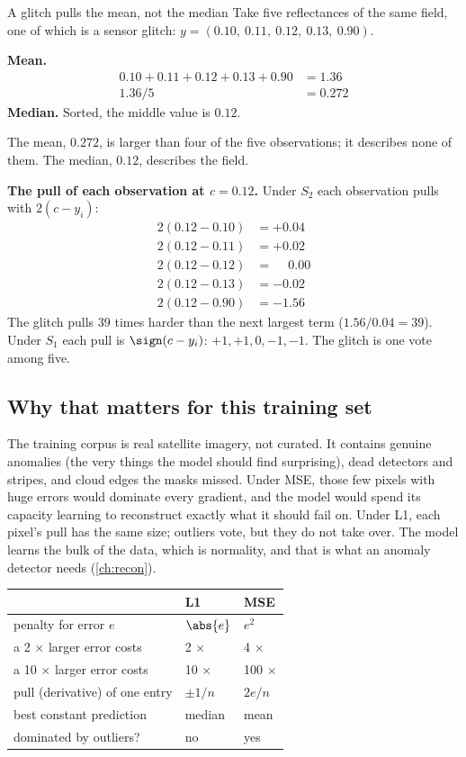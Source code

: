 \begin{worked}[label={we:losses:median}]{A glitch pulls the mean, not the median}
Take five reflectances of the same field, one of which is a sensor glitch:
$y = (0.10,\ 0.11,\ 0.12,\ 0.13,\ 0.90)$.

\textbf{Mean.}
\begin{align*}
0.10 + 0.11 + 0.12 + 0.13 + 0.90 &= 1.36\\
1.36 / 5 &= 0.272
\end{align*}
\textbf{Median.} Sorted, the middle value is $0.12$.

The mean, $0.272$, is larger than four of the five observations; it describes none of them. The
median, $0.12$, describes the field.

\textbf{The pull of each observation at $c = 0.12$.} Under $S_2$ each observation pulls with
$2(c - y_i)$:
\begin{align*}
2(0.12 - 0.10) &= +0.04\\
2(0.12 - 0.11) &= +0.02\\
2(0.12 - 0.12) &= \phantom{+}0.00\\
2(0.12 - 0.13) &= -0.02\\
2(0.12 - 0.90) &= -1.56
\end{align*}
The glitch pulls 39 times harder than the next largest term ($1.56 / 0.04 = 39$). Under $S_1$
each pull is $\sign(c - y_i)$: $+1, +1, 0, -1, -1$. The glitch is one vote among five.
\end{worked}

\subsection{Why that matters for this training set}

The training corpus is real satellite imagery, not curated. It contains genuine anomalies (the
very things the model should find surprising), dead detectors and stripes, and cloud edges
the masks missed. Under MSE, those few pixels with huge errors would dominate every gradient,
and the model would spend its capacity learning to reconstruct exactly what it should fail on.
Under L1, each pixel's pull has the same size; outliers vote, but they do not take over. The
model learns the bulk of the data, which is normality, and that is what an anomaly detector
needs (\cref{ch:recon}).

\begin{center}
\begin{tabular}{lll}
\toprule
 & L1 & MSE \\
\midrule
penalty for error $e$ & $\abs{e}$ & $e^2$\\
a 2 $\times$ larger error costs & 2 $\times$ & 4 $\times$\\
a 10 $\times$ larger error costs & 10 $\times$ & 100 $\times$\\
pull (derivative) of one entry & $\pm 1/n$ & $2e/n$\\
best constant prediction & median & mean\\
dominated by outliers? & no & yes\\
\bottomrule
\end{tabular}
\end{center}


